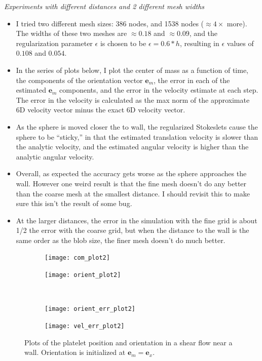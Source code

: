 \documentclass{article}
\newcommand{\vect}[1]{\boldsymbol{\mathbf{#1}}}
\begin{document}
\emph{Experiments with different distances and 2 different mesh
  widths}

\begin{itemize}
\item I tried two different mesh sizes: 386 nodes, and 1538 nodes
  ($\approx 4\times$ more). The widths of these two meshes are
  $\approx 0.18$ and $\approx 0.09$, and the regularization parameter
  $\epsilon$ is chosen to be $\epsilon = 0.6 * h$, resulting in
  $\epsilon$ values of $0.108$ and $0.054$.
\item In the series of plots below, I plot the center of mass as a
  function of time, the components of the orientation vector
  $\vect{e}_m$, the error in each of the estimated $\vect{e}_m$
  components, and the error in the velocity estimate at each step. The
  error in the velocity is calculated as the max norm of the
  approximate 6D velocity vector minus the exact 6D velocity vector.
\item As the sphere is moved closer the to wall, the regularized
  Stokeslets cause the sphere to be ``sticky,'' in that the estimated
  translation velocity is slower than the analytic velocity, and the estimated
  angular velocity is higher than the analytic angular velocity.
\item Overall, as expected the accuracy gets worse as the sphere
  approaches the wall. However one weird result is that the fine mesh
  doesn't do any better than the coarse mesh at the smallest
  distance. I should revisit this to make sure this isn't the result
  of some bug.
\item At the larger distances, the error in the simulation with the
  fine grid is about 1/2 the error with the coarse grid, but when the
  distance to the wall is the same order as the blob size, the finer
  mesh doesn't do much better.
\end{itemize}

\begin{figure}
  \centering
  \begin{subfigure}{0.49\textwidth}
    \texttt{[image: com\_plot2]}
  \end{subfigure}
  \hfill
  \begin{subfigure}{0.49\textwidth}
    \texttt{[image: orient\_plot2]}
  \end{subfigure}
  \\
  \begin{subfigure}{0.49\textwidth}
    \texttt{[image: orient\_err\_plot2]}
  \end{subfigure}
  \hfill
  \begin{subfigure}{0.49\textwidth}
    \texttt{[image: vel\_err\_plot2]}
  \end{subfigure}
  \caption{Plots of the platelet position and orientation in a shear
    flow near a wall. Orientation is initialized at $\vect{e}_m =
    \vect{e}_x$.} 
  \label{fig:com_plot2}
\end{figure}
\end{document}
